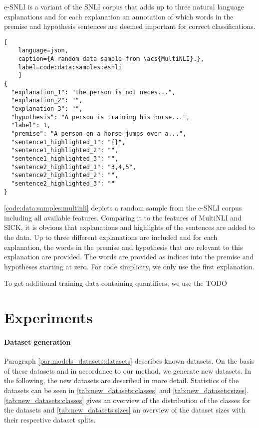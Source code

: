 \Acf{e-SNLI} \cite{esnli} is a variant of the \acs{SNLI} \cite{snli} corpus that adds up to three natural language explanations and for each explanation an annotation of which words in the premise and hypothesis sentences are deemed important for correct classifications.

\begin{lstlisting}[
    language=json,
    caption={A random data sample from \acs{MultiNLI}.},
    label=code:data:samples:esnli
    ]
{
  "explanation_1": "the person is not neces...",
  "explanation_2": "",
  "explanation_3": "",
  "hypothesis": "A person is training his horse...",
  "label": 1,
  "premise": "A person on a horse jumps over a...",
  "sentence1_highlighted_1": "{}",
  "sentence1_highlighted_2": "",
  "sentence1_highlighted_3": "",
  "sentence2_highlighted_1": "3,4,5",
  "sentence2_highlighted_2": "",
  "sentence2_highlighted_3": ""
}
\end{lstlisting}

\autoref{code:data:samples:multinli} depicts a random sample from the \acs{e-SNLI} corpus including all available features. Comparing it to the features of \acs{MultiNLI} and \acs{SICK}, it is obvious that explanations and highlights of the sentences are added to the data. Up to three different explanations are included and for each explanation, the words in the premise and hypothesis that are relevant to this explanation are provided. The words are provided as indices into the premise and hypotheses starting at zero. For code simplicity, we only use the first explanation.

To get additional training data containing quantifiers, we use the TODO

\section{Experiments}
\paragraph{Dataset generation}
Paragraph \ref{par:models_datasets:datasets} describes known datasets. On the basis of these datasets and in accordance to our method, we generate new datasets. In the following, the new datasets are described in more detail. Statistics of the datasets can be seen in \autoref{tab:new_datasets:classes} and \autoref{tab:new_datasets:sizes}. \autoref{tab:new_datasets:classes} gives an overview of the distribution of the classes for the datasets and \autoref{tab:new_datasets:sizes} an overview of the dataset sizes with their respective dataset splits.

